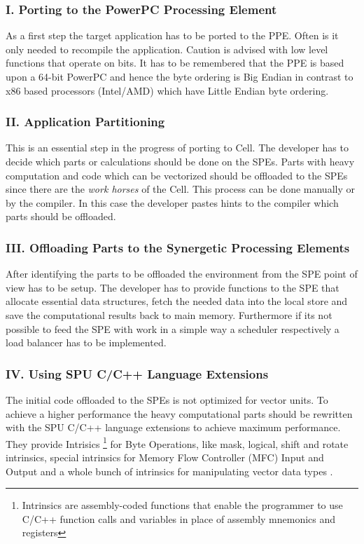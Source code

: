 \documentclass[DIV10, abstracton, openright, footsepline, headsepline, twoside, 9pt,
bigheadings]{scrreprt}
\begin{document}
\subsubsection*{I. Porting to the PowerPC Processing Element}
As a first step the target application has to be ported to the PPE. Often is
it only needed to recompile the application. Caution is advised with low level
functions that operate on bits. It has to be remembered that the PPE is based
upon a 64-bit PowerPC and hence the byte ordering is Big Endian in contrast to
x86 based processors (Intel/AMD) which have Little Endian byte ordering.

\subsubsection*{II. Application Partitioning}
This is an essential step in the progress of porting to Cell. The developer
has to decide which parts or calculations should be done on the SPEs.
Parts with heavy computation and code which can be vectorized should be offloaded
 to the SPEs since there are the \textit{work horses} of the Cell. This process
can be done manually or by the compiler. In this case the developer pastes hints
 to the compiler which parts should be offloaded.

\subsubsection*{III. Offloading Parts to the Synergetic Processing Elements}
After identifying the parts to be offloaded the environment from the SPE point
of view has to be setup. The developer has to provide functions to the SPE that
allocate essential data structures, fetch the needed data into the local store
and save the computational results back to main memory. Furthermore if its not
possible to feed the SPE with work in a simple way a scheduler respectively a
load balancer has to be implemented.

\subsubsection*{IV. Using SPU C/C++ Language Extensions}
The initial code offloaded to the SPEs is not optimized for vector units. To achieve a
higher performance the heavy computational parts should be rewritten with the
SPU C/C++ language extensions to achieve maximum performance. They provide
Intrisics \footnote{Intrinsics are assembly-coded functions that enable the
programmer to use C/C++ function calls and variables in place of assembly
mnemonics and registers} for Byte Operations, like mask, logical, shift and
rotate intrinsics, special intrinsics for Memory Flow Controller (MFC) Input and
 Output and a whole bunch of intrinsics for manipulating vector data types \cite{IBMle06}.
\end{document}
